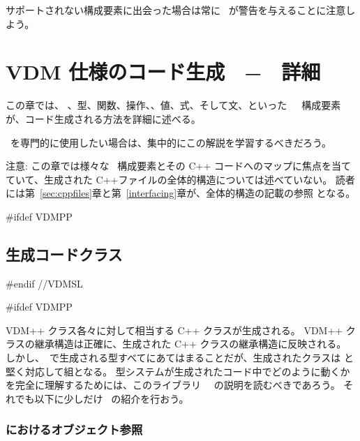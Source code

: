 \documentclass[\pformat,12pt]{jarticle}
\begin{document}
サポートされない構成要素に出会った場合は常に \Tcg\ が警告を与えることに注意しよう。

%



\section{VDM 仕様のコード生成　−　詳細}\label{sec:relation}

この章では、 、型、関数、操作、、値、式、そして文、といった　\VDM\ 構成要素が、コード生成される方法を詳細に述べる。

 \tcg\ を専門的に使用したい場合は、集中的にこの解説を学習するべきだろう。

注意: この章では様々な \VDM\ 構成要素とその C++ コードへのマップに焦点を当てていて、生成された C++ファイルの全体的構造については述べていない。
読者には第~\ref{sec:cppfiles}章と第~\ref{interfacing}章が、全体的構造の記載の参照 となる。


#ifdef VDMPP
\subsection{生成コードクラス}\label{sec:classes}
#endif //VDMSL


#ifdef VDMPP

VDM++ クラス各々に対して相当する C++ クラスが生成される。
 VDM++ クラスの継承構造は正確に、生成された C++ クラスの継承構造に反映される。
しかし、\tcg　で生成される型すべてにあてはまることだが、生成されたクラスは \MCL と堅く対応して組となる。
型システムが生成されたコード中でどのように動くかを完全に理解するためには、このライブラリ \libmancite　の説明を読むべきであろう。  
それでも以下に少しだけ \MCL\ の紹介を行おう。

\subsubsection{\MCL におけるオブジェクト参照}
\end{document}
